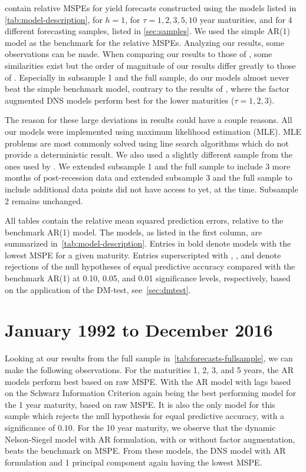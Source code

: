  contain relative MSPEs for yield forecasts constructed using the models listed in \cref{tab:model-description}, for $h = 1$, for $\tau = 1, 2, 3, 5, 10$ year maturities, and for 4 different forecasting samples, listed in \cref{sec:samples}. 
We used the simple AR(1) model as the benchmark for the relative MSPEs. 
Analyzing our results, some observations can be made. 
When comparing our results to those of \textcite{swanson_big_2017}, some similarities exist but the order of magnitude of our results differ greatly to those of \citeauthor{swanson_big_2017}. 
Especially in subsample 1 and the full sample, do our models almost never beat the simple benchmark model, contrary to the results of \citeauthor{swanson_big_2017}, where the factor augmented DNS models perform best for the lower maturities ($\tau = 1, 2, 3$).

The reason for these large deviations in results could have a couple reasons. All our models were implemented using maximum likelihood estimation (MLE). 
MLE problems are most commonly solved using line search algorithms which do not provide a deterministic result. 
We also used a slightly different sample from the ones used by \citeauthor{swanson_big_2017}. 
We extended subsample 1 and the full sample to include 3 more months of post-recession data and extended subsample 3 and the full sample to include additional data points \citeauthor{swanson_big_2017} did not have access to yet, at the time. 
Subsample 2 remains unchanged.

All tables contain the relative mean squared prediction errors, relative to the benchmark AR(1) model. 
The models, as listed in the first column, are summarized in~\cref{tab:model-description}. 
Entries in bold denote models with the lowest MSPE for a given maturity. 
Entries superscripted with \sym{*}, \sym{**}, and \sym{***} denote rejections of the null hypotheses of equal predictive accuracy compared with the benchmark AR(1) at 0.10, 0.05, and 0.01 significance levels, respectively, based on the application of the DM-test, see~\cref{sec:dmtest}. 

\section{January 1992 to December 2016}
Looking at our results from the full sample in~\cref{tab:forecasts-fullsample}, we can make the following observations. 
For the maturities 1, 2, 3, and 5 years, the AR models perform best based on raw MSPE. 
With the AR model with lags based on the Schwarz Information Criterion again being the best performing model for the 1 year maturity, based on raw MSPE.
It is also the only model for this sample which rejects the null hypothesis for equal predictive accuracy, with a significance of $0.10$. 
For the 10 year maturity, we observe that the dynamic Nelson-Siegel model with AR formulation, with or without factor augmentation, beats the benchmark on MSPE. 
From these models, the DNS model with AR formulation and 1 principal component again having the lowest MSPE. 

